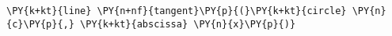 \begin{Verbatim}[commandchars=\\\{\}]
    \PY{k+kt}{line} \PY{n+nf}{tangent}\PY{p}{(}\PY{k+kt}{circle} \PY{n}{c}\PY{p}{,} \PY{k+kt}{abscissa} \PY{n}{x}\PY{p}{)}
\end{Verbatim}
